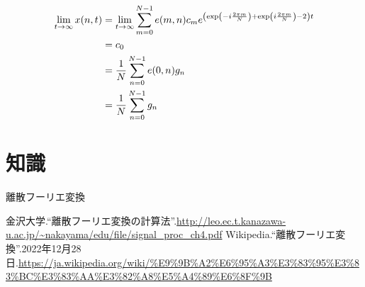 \documentclass[a4paper, 10pt, dvipdfmx]{jlreq}
\begin{document}
\begin{align*}
  \lim_{t\to\infty}x(n,t) & =\lim_{t\to\infty}\sum_{m=0}^{N-1}e(m,n)c_me^{\qty(\exp(-i\frac{2\pi m}{N})+\exp(i\frac{2\pi m}{N})-2)t} \\
                          & =c_0                                                                                                     \\
                          & =\frac{1}{N}\sum_{n=0}^{N-1}e(0,n)g_n                                                                    \\
                          & =\frac{1}{N}\sum_{n=0}^{N-1}g_n
\end{align*}

\section{知識}

離散フーリエ変換

\begin{thebibliography}{9}
  金沢大学.``離散フーリエ変換の計算法''.\url{http://leo.ec.t.kanazawa-u.ac.jp/~nakayama/edu/file/signal_proc_ch4.pdf}
  Wikipedia.``離散フーリエ変換''.2022年12月28日.\url{https://ja.wikipedia.org/wiki/%E9%9B%A2%E6%95%A3%E3%83%95%E3%83%BC%E3%83%AA%E3%82%A8%E5%A4%89%E6%8F%9B}
\end{thebibliography}
\end{document}
